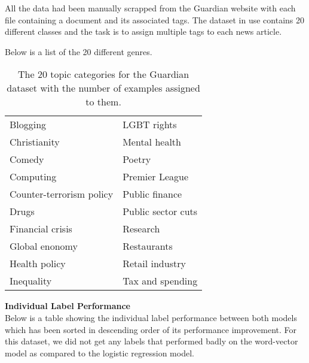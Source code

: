 All the data had been manually scrapped from the Guardian website with each file containing a document and its associated tags. The dataset in use contains 20 different classes and the task is to assign multiple tags to each news article.

Below is a list of the 20 different genres.

\begin{table}[htbp]
\centering
\begin{tabular}{l|l}
Blogging       & LGBT rights    \\
Christianity      & Mental health \\
Comedy     & Poetry       \\
Computing    & Premier League \\
Counter-terrorism policy      & Public finance   \\
Drugs      & Public sector cuts     \\
Financial crisis      & Research   \\
Global enonomy   & Restaurants   \\
Health policy & Retail industry     \\
Inequality     & Tax and spending      
\end{tabular}
\caption{\label{tab:widgets}The 20 topic categories for the Guardian dataset with the number of examples assigned to them.}
\end{table}

\noindent \textbf{Individual Label Performance}\\

Below is a table showing the individual label performance between both models which has been sorted in descending order of its performance improvement. For this dataset, we did not get any labels that performed badly on the word-vector model as compared to the logistic regression model.\\

